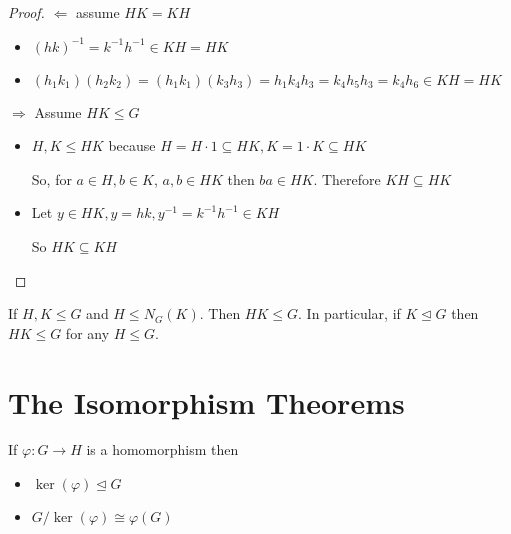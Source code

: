 \begin{proof}
  $\Leftarrow$ assume $HK = KH$
  \begin{itemize}
    \item $(hk)^{-1} = k^{-1}h^{-1} \in KH = HK$
    \item $(h_1k_1)(h_2k_2) = (h_1k_1)(k_3h_3) = h_1k_4h_3 = k_4h_5h_3 = k_4h_6 \in KH = HK$
  \end{itemize}
  $\Rightarrow$ Assume $HK \le G$ 
  \begin{itemize}
    \item 
  $H, K \le HK$ because $H = H\cdot 1 \subseteq HK, K = 1\cdot K \subseteq HK$
    
  So, for $a \in H, b \in K$, $a, b \in HK$ then $ba \in HK$. Therefore $KH \subseteq HK$

  \item Let $y \in HK, y = hk, y^{-1} = k^{-1}h^{-1} \in KH$

  So $HK \subseteq KH$
  \end{itemize}
\end{proof}
\begin{corollary}
  If $H, K \le G$ and $H \le N_G(K)$. Then $HK \le G$.
  In particular, if $K \unlhd G$ then $HK \le G$ for any $H \le G$.
\end{corollary}

\section{The Isomorphism Theorems}

\begin{theorem}
  If $\varphi: G \to H$ is a homomorphism then
  \begin{itemize}
    \item $\ker(\varphi) \trianglelefteq G$
    \item $G/\ker(\varphi) \cong \varphi(G)$
  \end{itemize} 
\end{theorem}

